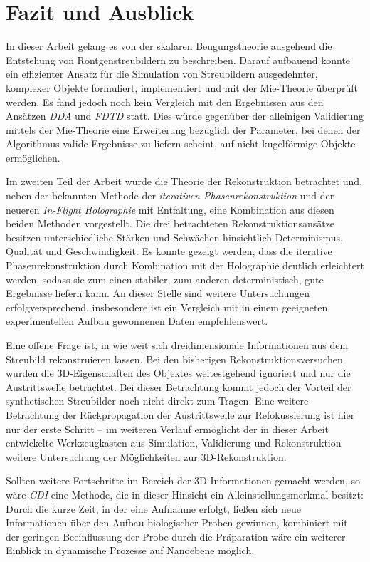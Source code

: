 \chapter{Fazit und Ausblick}
In dieser Arbeit gelang es von der skalaren Beugungstheorie ausgehend die Entstehung von Röntgenstreubildern zu beschreiben. Darauf aufbauend konnte ein effizienter Ansatz für die Simulation von Streubildern ausgedehnter, komplexer Objekte formuliert, implementiert und mit der Mie-Theorie überprüft werden. Es fand jedoch noch kein Vergleich mit den Ergebnissen aus den Ansätzen \textit{DDA} und \textit{FDTD} statt. Dies würde gegenüber der alleinigen Validierung mittels der Mie-Theorie eine Erweiterung bezüglich der Parameter, bei denen der Algorithmus valide Ergebnisse zu liefern scheint, auf nicht kugelförmige Objekte ermöglichen. 

Im zweiten Teil der Arbeit wurde die Theorie der Rekonstruktion betrachtet und, neben der bekannten Methode der \textit{iterativen Phasenrekonstruktion} und der neueren \textit{In-Flight Holographie} mit Entfaltung, eine Kombination aus diesen beiden Methoden vorgestellt. Die drei betrachteten Rekonstruktionsansätze besitzen unterschiedliche Stärken und Schwächen hinsichtlich Determinismus, Qualität und Geschwindigkeit. Es konnte gezeigt werden, dass die iterative Phasenrekonstruktion durch Kombination mit der Holographie deutlich erleichtert werden, sodass sie zum einen stabiler, zum anderen deterministisch, gute Ergebnisse liefern kann. An dieser Stelle sind weitere Untersuchungen erfolgversprechend, insbesondere ist ein Vergleich mit in einem geeigneten experimentellen Aufbau gewonnenen Daten empfehlenswert.

Eine offene Frage ist, in wie weit sich dreidimensionale Informationen aus dem Streubild rekonstruieren lassen. Bei den bisherigen Rekonstruktionsversuchen wurden die 3D-Eigenschaften des Objektes weitestgehend ignoriert und nur die Austrittswelle betrachtet. Bei dieser Betrachtung kommt jedoch der Vorteil der synthetischen Streubilder noch nicht direkt zum Tragen. Eine weitere Betrachtung der Rückpropagation der Austrittswelle zur Refokussierung ist hier nur der erste Schritt -- im weiteren Verlauf ermöglicht der in dieser Arbeit entwickelte Werkzeugkasten aus Simulation, Validierung und Rekonstruktion weitere Untersuchung der Möglichkeiten zur 3D-Rekonstruktion. 

Sollten weitere Fortschritte im Bereich der 3D-Informationen gemacht werden, so wäre \textit{CDI} eine Methode, die in dieser Hinsicht ein Alleinstellungsmerkmal besitzt: Durch die kurze Zeit, in der eine Aufnahme erfolgt, ließen sich neue Informationen über den Aufbau biologischer Proben gewinnen, kombiniert mit der geringen Beeinflussung der Probe durch die Präparation wäre ein weiterer Einblick in dynamische Prozesse auf Nanoebene möglich. 